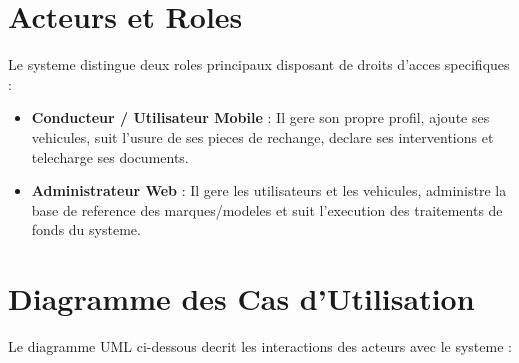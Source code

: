 \documentclass[11pt,a4paper]{report}
\begin{document}
\section{Acteurs et Roles}
Le systeme distingue deux roles principaux disposant de droits d'acces specifiques :
\begin{itemize}[label=\textbullet]
    \item \textbf{Conducteur / Utilisateur Mobile} : Il gere son propre profil, ajoute ses vehicules, suit l'usure de ses pieces de rechange, declare ses interventions et telecharge ses documents.
    \item \textbf{Administrateur Web} : Il gere les utilisateurs et les vehicules, administre la base de reference des marques/modeles et suit l'execution des traitements de fonds du systeme.
\end{itemize}

\section{Diagramme des Cas d'Utilisation}
Le diagramme UML ci-dessous decrit les interactions des acteurs avec le systeme :
\end{document}
